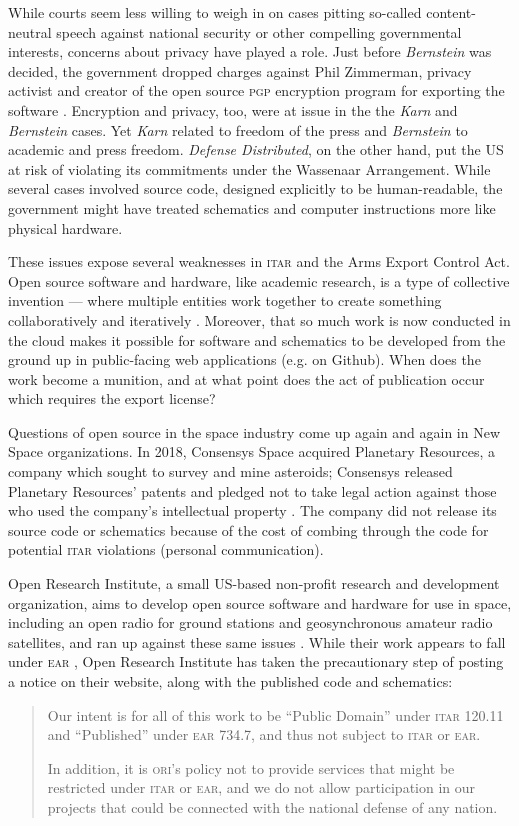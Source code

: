 \documentclass[12pt]{olfmemo}
\begin{document}
While courts seem less willing to weigh in on cases pitting so-called content-neutral speech against national security or other compelling governmental interests, concerns about privacy have played a role. Just before \textit{Bernstein} was decided, the government dropped charges against Phil Zimmerman, privacy activist and creator of the open source \textsc{pgp} encryption program for exporting the software \citep{Markoff1996}. Encryption and privacy, too, were at issue in the the \textit{Karn} and \textit{Bernstein} cases. Yet \textit{Karn} related to freedom of the press and \textit{Bernstein} to academic and press freedom. \textit{Defense Distributed}, on the other hand, put the US at risk of violating its commitments under the Wassenaar Arrangement. While several cases involved source code, designed explicitly to be human-readable, the government might have treated schematics and computer instructions more like physical hardware.

These issues expose several weaknesses in \textsc{itar} and the Arms Export Control Act. Open source software and hardware, like academic research, is a type of collective invention --- where multiple entities work together to create something collaboratively and iteratively \citep{Allen1983,Schrape2019}. Moreover, that so much work is now conducted in the cloud makes it possible for software and schematics to be developed from the ground up in public-facing web applications (e.g. on Github). When does the work become a munition, and at what point does the act of publication occur which requires the export license?

Questions of open source in the space industry come up again and again in New Space organizations. In 2018, Consensys Space acquired Planetary Resources, a company which sought to survey and mine asteroids; Consensys released Planetary Resources' patents and pledged not to take legal action against those who used the company's intellectual property \citep{Consensys2018}. The company did not release its source code or schematics because of the cost of combing through the code for potential \textsc{itar} violations (personal communication).

Open Research Institute, a small US-based non-profit research and development organization, aims to develop open source software and hardware for use in space, including an open radio for ground stations and geosynchronous amateur radio satellites, and ran up against these same issues \citep{ORIBlog}. While their work appears to fall under \textsc{ear} \citep{ORIDDTC}, Open Research Institute has taken the precautionary step of posting a notice on their website, along with the published code and schematics:
\begin{quote}
Our intent is for all of this work to be ``Public Domain'' under \textsc{itar} 120.11 and ``Published'' under \textsc{ear} 734.7, and thus not subject to \textsc{itar} or \textsc{ear}.

In addition, it is \textsc{ori}'s policy not to provide services that might be restricted under \textsc{itar} or \textsc{ear}, and we do not allow participation in our projects that could be connected with the national defense of any nation.
\end{quote}
\end{document}
